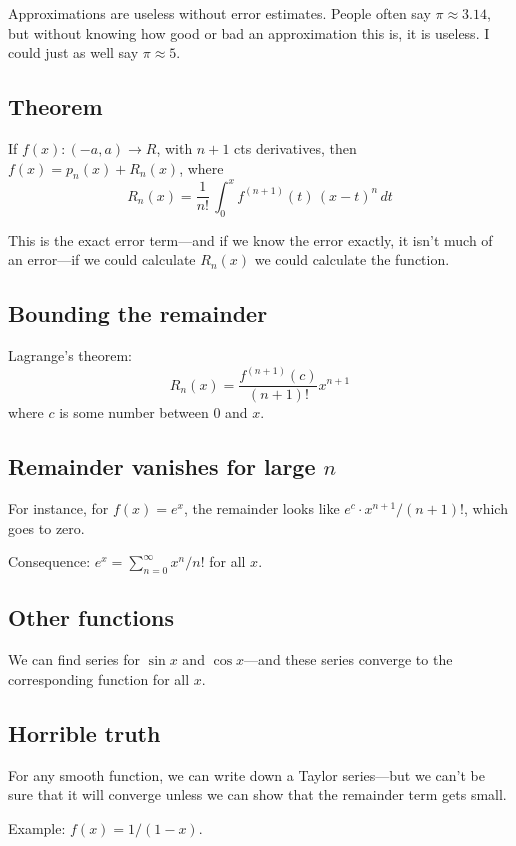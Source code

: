 \documentclass[12pt]{article}
\begin{document}
Approximations are useless without error estimates.  People often say
$\pi \approx 3.14$, but without knowing how good or bad an
approximation this is, it is useless.  I could just as well say $\pi
\approx 5$.

\subsection{Theorem}

If $f(x) : (-a,a) \to R$, with $n+1$ cts derivatives, then $f(x) = p_n(x) + R_n(x)$, where
$$
R_n(x) = \frac{1}{n!} \, \int_0^x f^{(n+1)}(t) \, (x-t)^n \, dt
$$

This is the exact error term---and if we know the error exactly, it
isn't much of an error---if we could calculate $R_n(x)$ we could
calculate the function.

\subsection{Bounding the remainder}

Lagrange's theorem:
$$
R_n(x) = \frac{f^{(n+1)}(c)}{(n+1)!} x^{n+1}
$$
where $c$ is some number between $0$ and $x$.

\subsection{Remainder vanishes for large $n$}

For instance, for $f(x) = e^x$, the remainder looks like $e^c \cdot x^{n+1}/(n+1)!$, which goes to zero.

Consequence: $e^x = \sum_{n=0}^\infty x^n/n!$ for all $x$.

\subsection{Other functions}

We can find series for $\sin x$ and $\cos x$---and these series converge to the corresponding function for all $x$.

\subsection{Horrible truth}

For any smooth function, we can write down a Taylor series---but we
can't be sure that it will converge unless we can show that the
remainder term gets small.

Example: $f(x) = 1/(1-x)$.
\end{document}

